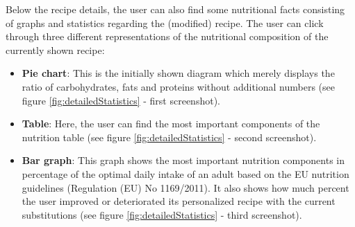 Below the recipe details, the user can also find some nutritional facts consisting of graphs and statistics regarding the (modified) recipe. The user can click through three different representations of the nutritional composition of the currently shown recipe:
\begin{itemize}
\item \textbf{Pie chart}: This is the initially shown diagram which merely displays the ratio of carbohydrates, fats and proteins without additional numbers (see figure \ref{fig:detailedStatistics} - first screenshot).
\item \textbf{Table}: Here, the user can find the most important components of the nutrition table (see figure \ref{fig:detailedStatistics} - second screenshot).
\item \textbf{Bar graph}: This graph shows the most important nutrition components in percentage of the optimal daily intake of an adult based on the EU nutrition guidelines (Regulation (EU) No 1169/2011). It also shows how much percent the user improved or deteriorated its personalized recipe with the current substitutions (see figure \ref{fig:detailedStatistics} - third screenshot).
\end{itemize}


